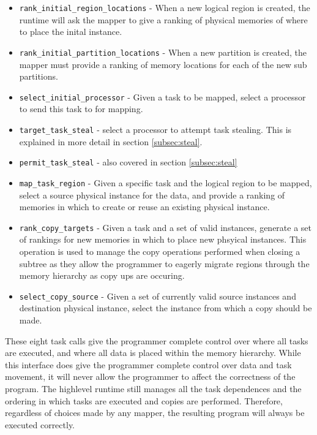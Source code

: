\begin{itemize}
\item {\tt rank\_initial\_region\_locations} - When a new logical region is created, the runtime
will ask the mapper to give a ranking of physical memories of where to place the inital instance.

\item {\tt rank\_initial\_partition\_locations} - When a new partition is created, the mapper
must provide a ranking of memory locations for each of the new sub partitions.

\item {\tt select\_initial\_processor} - Given a task to be mapped, select a processor to
send this task to for mapping.  

\item {\tt target\_task\_steal} - select a processor to attempt task stealing.  This is explained
in more detail in section \ref{subsec:steal}.  

\item {\tt permit\_task\_steal} - also covered in section \ref{subsec:steal}

\item {\tt map\_task\_region} - Given a specific task and the logical region to be mapped, select
a source physical instance for the data, and provide a ranking of memories in which to create
or reuse an existing physical instance.

\item {\tt rank\_copy\_targets} - Given a task and a set of valid instances, generate a set of
rankings for new memories in which to place new phsyical instances.  This operation is used to
manage the copy operations performed when closing a subtree as they allow the programmer to
eagerly migrate regions through the memory hierarchy as copy ups are occuring.

\item {\tt select\_copy\_source} - Given a set of currently valid source instances and destination
physical instance, select the instance from which a copy should be made.
\end{itemize}

These eight task calls give the programmer complete control over where all tasks are executed, and
where all data is placed within the memory hierarchy.  While this interface does give the programmer
complete control over data and task movement, it will never allow the programmer to affect the
correctness of the program.  The highlevel runtime still manages all the task dependences and the
ordering in which tasks are executed and copies are performed.  Therefore, regardless of choices
made by any mapper, the resulting program will always be executed correctly.

